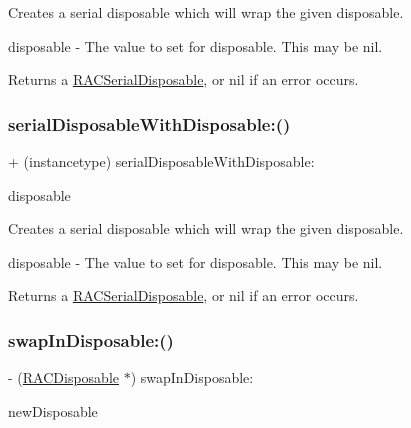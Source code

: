 Creates a serial disposable which will wrap the given disposable.

disposable -\/ The value to set for {\ttfamily disposable}. This may be nil.

Returns a \mbox{\hyperlink{interface_r_a_c_serial_disposable}{R\+A\+C\+Serial\+Disposable}}, or nil if an error occurs. \mbox{\label{interface_r_a_c_serial_disposable_a4d1effa565e832a3d4cea3257745f2c6}} 
\subsubsection{\texorpdfstring{serial\+Disposable\+With\+Disposable\+:()}{serialDisposableWithDisposable:()}\hspace{0.1cm}{\footnotesize\ttfamily [3/3]}}
{\footnotesize\ttfamily + (instancetype) serial\+Disposable\+With\+Disposable\+: \begin{DoxyParamCaption}\item[{(\mbox{\hyperlink{interface_r_a_c_disposable}{R\+A\+C\+Disposable}} $\ast$)}]{disposable }\end{DoxyParamCaption}}

Creates a serial disposable which will wrap the given disposable.

disposable -\/ The value to set for {\ttfamily disposable}. This may be nil.

Returns a \mbox{\hyperlink{interface_r_a_c_serial_disposable}{R\+A\+C\+Serial\+Disposable}}, or nil if an error occurs. \mbox{\label{interface_r_a_c_serial_disposable_ad850b6d2134907b94937832f1aea2d20}} 
\subsubsection{\texorpdfstring{swap\+In\+Disposable\+:()}{swapInDisposable:()}\hspace{0.1cm}{\footnotesize\ttfamily [1/3]}}
{\footnotesize\ttfamily -\/ (\mbox{\hyperlink{interface_r_a_c_disposable}{R\+A\+C\+Disposable}} $\ast$) swap\+In\+Disposable\+: \begin{DoxyParamCaption}\item[{(\mbox{\hyperlink{interface_r_a_c_disposable}{R\+A\+C\+Disposable}} $\ast$)}]{new\+Disposable }\end{DoxyParamCaption}}

